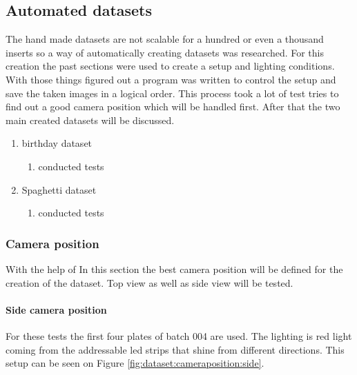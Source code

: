 	\subsection{Automated datasets}

	The hand made datasets are not scalable for a hundred or even a thousand inserts so a way of automatically creating datasets was researched. For this creation the past sections were used to create a setup and lighting conditions. With those things figured out a program was written to control the setup and save the taken images in a logical order. This process took a lot of test tries to find out a good camera position which will be handled first. After that the two main created datasets will be discussed.
	
	
	\begin{enumerate}[1]
	\item birthday dataset
		\begin{enumerate}[a]
		\item conducted tests
		\end{enumerate}
	\item Spaghetti dataset
		\begin{enumerate}[a]
		\item conducted tests
		\end{enumerate}
	\end{enumerate}


		\subsubsection{Camera position}
		
		With the help of 
		In this section the best camera position will be defined  for the creation of the dataset. Top view as well as side view will be tested.

		\paragraph{Side camera position}

For these tests the first four plates of batch 004 are used. The lighting is red light coming from the addressable led strips that shine from different directions. This setup can be seen on Figure \ref{fig:dataset:cameraposition:side}.


